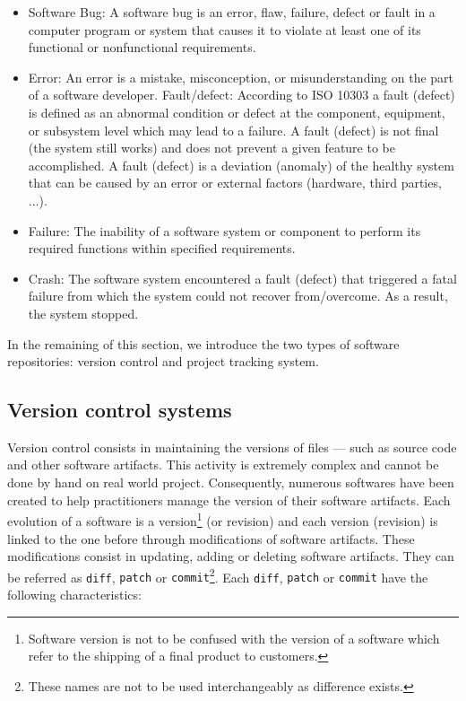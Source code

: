\begin{itemize}
	\item Software Bug: A software bug is an error, flaw, failure, defect or fault in a computer program or system that causes it to violate at least one of its functional or nonfunctional requirements.
	\item Error: An error is a mistake, misconception, or misunderstanding on the part of a software developer.
	Fault/defect: According to ISO 10303 a fault (defect) is defined as an abnormal condition or defect at the component, equipment, or subsystem level which may lead to a failure. A fault (defect) is not final (the system still works) and does not prevent a given feature to be accomplished.  A fault (defect) is a deviation (anomaly) of the healthy system that can be caused by an error or external factors (hardware, third parties, ...).
	\item Failure: The inability of a software system or component to perform its required functions within specified requirements.
	\item Crash: The software system encountered a fault (defect) that triggered a fatal failure from which the system could not recover from/overcome. As a result,  the system stopped.
\end{itemize}

In the remaining of this section, we introduce the two types of software repositories: version control and project tracking system.

\subsection{Version control systems\label{sec:version-control}}

Version control consists in maintaining the versions of files --- such as source code and other software artifacts.
This activity is extremely complex and cannot be done by hand on real world project.
Consequently, numerous softwares have been created to help practitioners manage the version of their software artifacts.
Each evolution of a software is a version\footnote{Software version is not to be confused with the version of a software which refer to the shipping of a final product to customers.} (or revision) and each version (revision) is linked to the one before through modifications of software artifacts.
These modifications consist in updating, adding or deleting software artifacts.
They can be referred as \texttt{diff}, {\tt patch} or {\tt commit}\footnote{These names are not to be used interchangeably as difference exists.}.
Each \texttt{diff}, {\tt patch} or {\tt commit} have the following characteristics:

